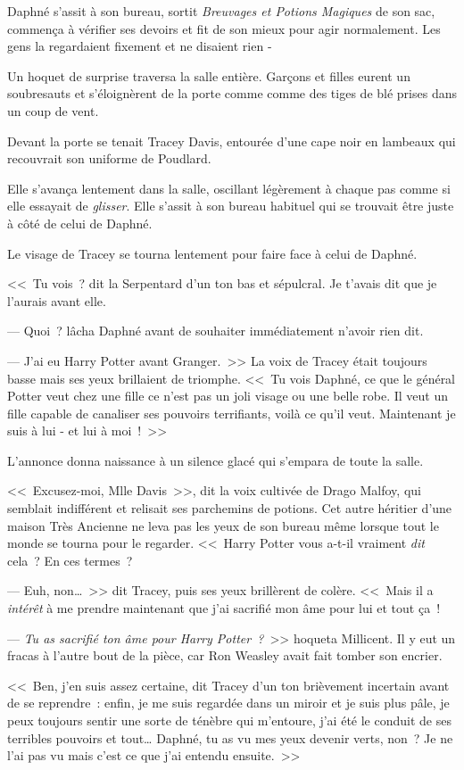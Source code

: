 Daphné s'assit à son bureau, sortit \emph{Breuvages et Potions Magiques} de son sac, commença à vérifier ses devoirs et fit de son mieux pour agir normalement. Les gens la regardaient fixement et ne disaient rien -

Un hoquet de surprise traversa la salle entière. Garçons et filles eurent un soubresauts et s'éloignèrent de la porte comme comme des tiges de blé prises dans un coup de vent.

Devant la porte se tenait Tracey Davis, entourée d'une cape noir en lambeaux qui recouvrait son uniforme de Poudlard.

Elle s'avança lentement dans la salle, oscillant légèrement à chaque pas comme si elle essayait de \emph{glisser}. Elle s'assit à son bureau habituel qui se trouvait être juste à côté de celui de Daphné.

Le visage de Tracey se tourna lentement pour faire face à celui de Daphné.

<<~Tu vois~? dit la Serpentard d'un ton bas et sépulcral. Je t'avais dit que je l'aurais avant elle.

--- Quoi~? lâcha Daphné avant de souhaiter immédiatement n'avoir rien dit.

--- J'ai eu Harry Potter avant Granger.~>> La voix de Tracey était toujours basse mais ses yeux brillaient de triomphe. <<~Tu vois Daphné, ce que le général Potter veut chez une fille ce n'est pas un joli visage ou une belle robe. Il veut un fille capable de canaliser ses pouvoirs terrifiants, voilà ce qu'il veut. Maintenant je suis à lui - et lui à moi~!~>>

L'annonce donna naissance à un silence glacé qui s'empara de toute la salle.

<<~Excusez-moi, Mlle Davis~>>, dit la voix cultivée de Drago Malfoy, qui semblait indifférent et relisait ses parchemins de potions. Cet autre héritier d'une maison Très Ancienne ne leva pas les yeux de son bureau même lorsque tout le monde se tourna pour le regarder. <<~Harry Potter vous a-t-il vraiment \emph{dit} cela~? En ces termes~?

--- Euh, non…~>> dit Tracey, puis ses yeux brillèrent de colère. <<~Mais il a \emph{intérêt} à me prendre maintenant que j'ai sacrifié mon âme pour lui et tout ça~!

--- \emph{Tu as sacrifié ton âme pour Harry Potter~?}~>> hoqueta Millicent. Il y eut un fracas à l'autre bout de la pièce, car Ron Weasley avait fait tomber son encrier.

<<~Ben, j'en suis assez certaine, dit Tracey d'un ton brièvement incertain avant de se reprendre~: enfin, je me suis regardée dans un miroir et je suis plus pâle, je peux toujours sentir une sorte de ténèbre qui m'entoure, j'ai été le conduit de ses terribles pouvoirs et tout… Daphné, tu as vu mes yeux devenir verts, non~? Je ne l'ai pas vu mais c'est ce que j'ai entendu ensuite.~>>

